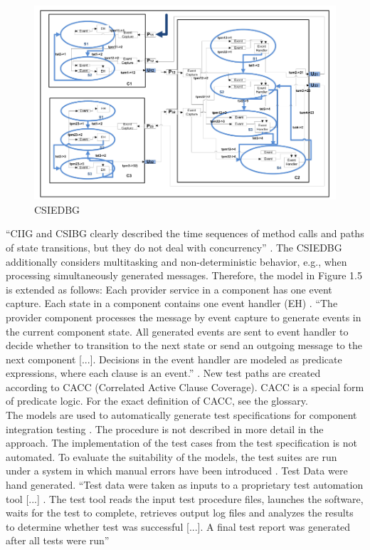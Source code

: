 \begin{figure}[H]
	\centering
	\includegraphics{../images/CSIEDBG} 
	\caption{CSIEDBG \cite{Guan2015} }
\end{figure}
\enquote{CIIG and CSIBG clearly described the time sequences
of method calls and paths of state transitions, but they do not deal
with concurrency} \cite{Guan2015}. The CSIEDBG additionally
considers multitasking and non-deterministic behavior, e.g., when
processing simultaneously generated messages. Therefore, the model
in Figure 1.5 is extended as follows: Each provider service in a component
has one event capture. Each state in a component contains one event
handler (EH) \cite{Guan2015}. \enquote{The provider component
processes the message by event capture to generate events in the current
component state. All generated events are sent to event handler to
decide whether to transition to the next state or send an outgoing
message to the next component {[}...{]}. Decisions in the event handler
are modeled as predicate expressions, where each clause is an event.}
\cite{Guan2015}. New test paths are created according to CACC (Correlated
Active Clause Coverage). CACC is a special form of predicate logic.
For the exact definition of CACC, see the glossary.\\
The models are used to automatically generate test specifications
for component integration testing \cite{Guan2015}. The procedure
is not described in more detail in the approach. The implementation
of the test cases from the test specification is not automated. To
evaluate the suitability of the models, the test suites are run under
a system in which manual errors have been introduced \cite{Guan2015}.
Test Data were hand generated. \enquote{Test data were taken
as inputs to a proprietary test automation tool {[}...{]} . The test
tool reads the input test procedure files, launches the software,
waits for the test to complete, retrieves output log files and analyzes
the results to determine whether test was successful {[}...{]}. A
final test report was generated after all tests were run}
